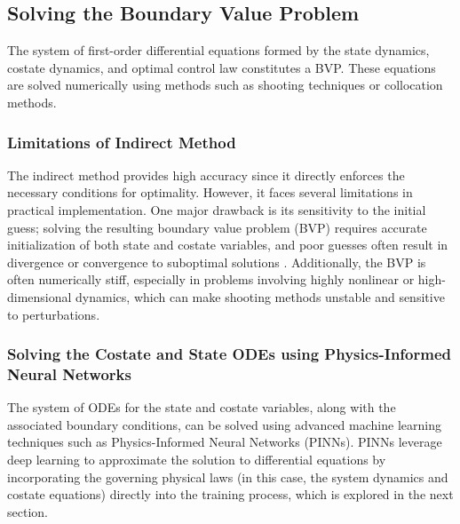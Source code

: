 \subsection{Solving the Boundary Value Problem}

The system of first-order differential equations formed by the state dynamics, costate dynamics, and optimal control law constitutes a BVP. These equations are solved numerically using methods such as shooting techniques or collocation methods.

\subsubsection{Limitations of Indirect Method}

The indirect method provides high accuracy since it directly enforces the necessary conditions for optimality. However, it faces several limitations in practical implementation. One major drawback is its sensitivity to the initial guess; solving the resulting boundary value problem (BVP) requires accurate initialization of both state and costate variables, and poor guesses often result in divergence or convergence to suboptimal solutions \cite{sanchez2018real}. Additionally, the BVP is often numerically stiff, especially in problems involving highly nonlinear or high-dimensional dynamics, which can make shooting methods unstable and sensitive to perturbations. 


\subsubsection{Solving the Costate and State ODEs using Physics-Informed Neural Networks}

The system of ODEs for the state and costate variables, along with the associated boundary conditions, can be solved using advanced machine learning techniques such as Physics-Informed Neural Networks (PINNs). PINNs leverage deep learning to approximate the solution to differential equations\cite{raissi2019physics} by incorporating the governing physical laws (in this case, the system dynamics and costate equations) directly into the training process, which is explored in the next section.



